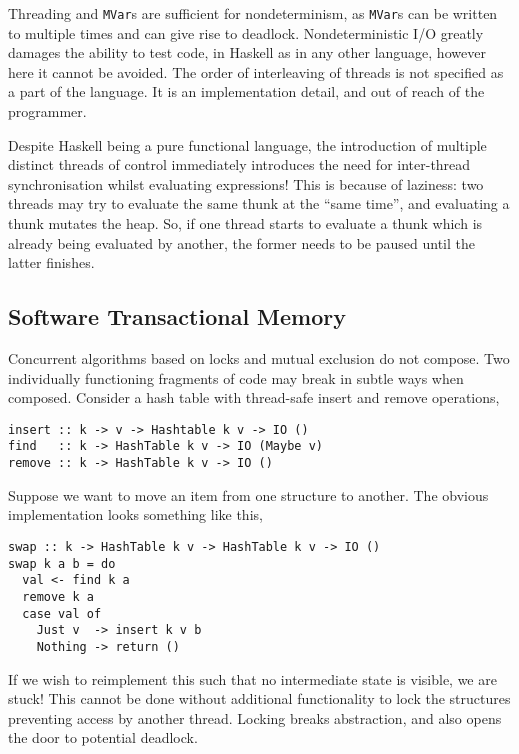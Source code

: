 Threading and \verb|MVar|s are sufficient for nondeterminism, as
\verb|MVar|s can be written to multiple times and can give rise to
deadlock. Nondeterministic I/O greatly damages the ability to test
code, in Haskell as in any other language, however here it cannot be
avoided. The order of interleaving of threads is not specified as a
part of the language. It is an implementation detail, and out of reach
of the programmer.

Despite Haskell being a pure functional language, the introduction of
multiple distinct threads of control immediately introduces the need
for inter-thread synchronisation whilst evaluating
expressions\cite{concurrent}! This is because of laziness: two threads
may try to evaluate the same thunk at the ``same time'', and
evaluating a thunk mutates the heap. So, if one thread starts to
evaluate a thunk which is already being evaluated by another, the
former needs to be paused until the latter finishes.

\subsection{Software Transactional Memory}
\label{sec:litrev-conc-stm}

Concurrent algorithms based on locks and mutual exclusion do not
compose. Two individually functioning fragments of code may break in
subtle ways when composed. Consider a hash table with thread-safe
insert and remove operations,

\begin{verbatim}
insert :: k -> v -> Hashtable k v -> IO ()
find   :: k -> HashTable k v -> IO (Maybe v)
remove :: k -> HashTable k v -> IO ()
\end{verbatim}

Suppose we want to move an item from one structure to another. The
obvious implementation looks something like this,

\begin{verbatim}
swap :: k -> HashTable k v -> HashTable k v -> IO ()
swap k a b = do
  val <- find k a
  remove k a
  case val of
    Just v  -> insert k v b
    Nothing -> return ()
\end{verbatim}

If we wish to reimplement this such that no intermediate state is
visible, we are stuck! This cannot be done without additional
functionality to lock the structures preventing access by another
thread. Locking breaks abstraction, and also opens the door to
potential deadlock.

